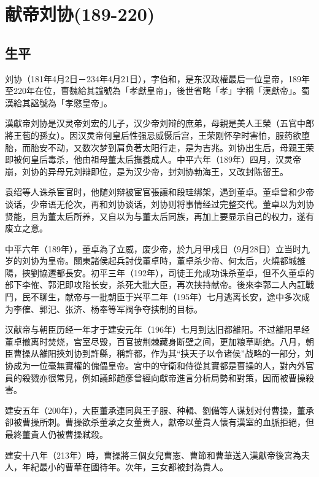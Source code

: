 
\section{献帝刘协\tiny(189-220)}

\subsection{生平}

刘协（181年4月2日－234年4月21日），字伯和，是东汉政權最后一位皇帝，189年至220年在位，曹魏給其諡號為「孝獻皇帝」，後世省略「孝」字稱「漢獻帝」。蜀漢給其諡號為「孝愍皇帝」。

漢獻帝刘协是汉灵帝刘宏的儿子，汉少帝刘辩的庶弟，母親是美人王榮（五官中郎將王苞的孫女）。因汉灵帝何皇后性强忌威慑后宫，王荣刚怀孕时害怕，服药欲堕胎，而胎安不动，又数次梦到肩负著太阳行走，是为吉兆。刘协出生后，母親王荣即被何皇后毒杀，他由祖母董太后撫養成人。中平六年（189年）四月，汉灵帝崩，刘协的异母兄刘辩即位，是为汉少帝，封刘协勃海王，又改封陈留王。

袁绍等人诛杀宦官时，他随刘辩被宦官張讓和段珪绑架，遇到董卓。董卓曾和少帝谈话，少帝语无伦次，再和刘协谈话，刘协则将事情经过完整交代。董卓以为刘协贤能，且为董太后所养，又自以为与董太后同族，再加上要显示自己的权力，遂有废立之意。

中平六年（189年），董卓為了立威，废少帝，於九月甲戌日（9月28日）立当时九岁的刘协为皇帝。關東諸侯起兵討伐董卓時，董卓杀少帝、何太后，火燒都城雒陽，挾劉協遷都長安。初平三年（192年），司徒王允成功诛杀董卓，但不久董卓的部下李傕、郭汜即攻陷长安，杀死大批大臣，再次挟持献帝。後來李郭二人內訌戰鬥，民不聊生，献帝与一批朝臣于兴平二年（195年）七月逃离长安，途中多次成为李傕、郭汜、张济、杨奉等军阀争夺挟制的目标。

汉献帝与朝臣历经一年才于建安元年（196年）七月到达旧都雒阳。不过雒阳早经董卓撤离时焚烧，宫室尽毁，百官披荆棘藏身断壁之间，更加粮草断绝。八月，朝臣曹操从雒阳挾刘协到許縣，稱許都，作为其“挟天子以令诸侯”战略的一部分，刘协成为一位毫無實權的傀儡皇帝。宮中的守衛和侍從其實都是曹操的人，對內外官員的殺戮亦很常見，例如議郎趙彥曾經向獻帝進言分析局勢和對策，因而被曹操殺害。

建安五年（200年），大臣董承連同與王子服、种輯、劉備等人谋划对付曹操，董承卻被曹操所刺。曹操欲杀董承之女董贵人，獻帝以董貴人懷有漢室的血脈拒絕，但最終董貴人仍被曹操弒殺。

建安十八年（213年）時，曹操將三個女兒曹憲、曹節和曹華送入漢獻帝後宮為夫人，年紀最小的曹華在國待年。次年，三女都被封為貴人。

